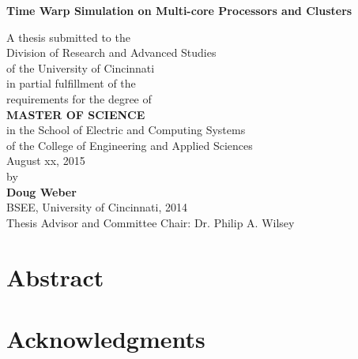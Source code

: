 \documentclass[11pt]{book}
\begin{document}
\thispagestyle{empty}

\doublespacing

\vspace*{0.5in}

\begin{center}
\LARGE{\textbf{Time Warp Simulation on Multi-core Processors and Clusters}}

\vspace*{0.4in}

  {\large A thesis submitted to the\\[0.20in]
    Division of Research and Advanced Studies\\
    of the University of Cincinnati\\[0.20in]
    in partial fulfillment of the\\
    requirements for the degree of\\[0.20in]
    \textbf{MASTER OF SCIENCE}\\[0.20in]
    in the School of Electric and Computing Systems\\
    of the College of Engineering and Applied Sciences\\[0.20in]
    August xx, 2015\\[0.20in]
    by\\[0.20in]
    \textbf{Doug Weber}\\
    BSEE, University of Cincinnati, 2014\\}
  \vspace{0.5in}
  {\large Thesis Advisor and Committee Chair:  Dr. Philip A. Wilsey}
\end{center}

\clearpage

\setcounter{page}{1}
\clearpage

\chapter*{Abstract} 


\chapter*{Acknowledgments} 
\end{document}

